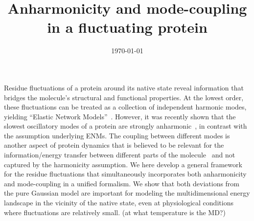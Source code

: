 \documentclass{article}
\begin{document}
\title{Anharmonicity and mode-coupling in a fluctuating protein}

\author{}

\date{\today }

\begin{abstract}
\end{abstract}

\pacs{}

\maketitle

Residue fluctuations of a protein around its native state reveal
information that bridges the molecule's structural and functional
properties.  At the lowest order, these fluctuations can be treated as
a collection of independent harmonic modes, yielding ``Elastic Network
Models''~\cite{ENM}. However, it was recently shown that the slowest
oscillatory modes of a protein are strongly
anharmonic~\cite{Yogurtcu}, in contrast with the assumption underlying
ENMs. The coupling between different modes is another aspect of
protein dynamics that is believed to be relevant for the
information/energy transfer between different parts of the
molecule~\cite{mode_coupling_ref} and not captured by the harmonicity
assumption. We here develop a general framework for the residue
fluctuations that simultaneously incorporates both anharmonicity and
mode-coupling in a unified formalism. We show that both deviations
from the pure Gaussian model are important for modeling the
multidimensional energy landscape in the vicinity of the native state,
even at physiological conditions where fluctuations are relatively
small. (at what temperature is the MD?)
\end{document}
